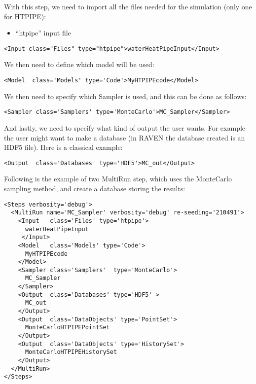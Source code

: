 With this step, we need to import all the files needed for the simulation (only one for HTPIPE):
\begin{itemize}
  \item ``htpipe'' input file
\end{itemize}
\begin{lstlisting}[style=XML,morekeywords={name,class,type}]
    <Input class="Files" type="htpipe">waterHeatPipeInput</Input>
\end{lstlisting}
We then need to define which model will be used:
\begin{lstlisting}[style=XML]
    <Model  class='Models' type='Code'>MyHTPIPEcode</Model>
\end{lstlisting}
We then need to specify which Sampler is used, and this can be done as follows:
\begin{lstlisting}[style=XML]
    <Sampler class='Samplers' type='MonteCarlo'>MC_Sampler</Sampler>
\end{lstlisting}
And lastly, we need to specify what kind of output the user wants.
%
For example the user might want to make a database (in RAVEN the database
created is an HDF5 file).
%
Here is a classical example:
\begin{lstlisting}[style=XML,morekeywords={class,type}]
    <Output  class='Databases' type='HDF5'>MC_out</Output>
\end{lstlisting}

Following is the example of two MultiRun step, which uses the MonteCarlo sampling
method, and create a database storing the results:
\begin{lstlisting}[style=XML]
<Steps verbosity='debug'>
  <MultiRun name='MC_Sampler' verbosity='debug' re-seeding='210491'>
    <Input   class='Files' type='htpipe'>
      waterHeatPipeInput
     </Input>
    <Model   class='Models' type='Code'>
      MyHTPIPEcode
    </Model>
    <Sampler class='Samplers'  type='MonteCarlo'>
      MC_Sampler
    </Sampler>
    <Output  class='Databases' type='HDF5' >
      MC_out
    </Output>
    <Output  class='DataObjects' type='PointSet'>
      MonteCarloHTPIPEPointSet
    </Output>
    <Output  class='DataObjects' type='HistorySet'>
      MonteCarloHTPIPEHistorySet
    </Output>
  </MultiRun>
</Steps>
\end{lstlisting}

